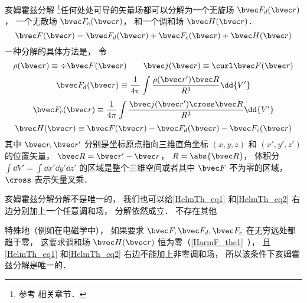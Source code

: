 
\begin{issues}
\issueTODO
\end{issues}


\begin{theorem}{亥姆霍兹分解}
\footnote{参考 \cite{GriffE} 相关章节．}任何处处可导的矢量场都可以分解为一个无旋场 $\bvec F_{d}(\bvec r)$， 一个无散场 $\bvec F_{c}(\bvec r)$， 和一个调和场 $\bvec H(\bvec r)$．
\begin{equation}\label{HelmTh_eq3}
\bvec F(\bvec r) = \bvec F_{d}(\bvec r) + \bvec F_{c}(\bvec r) + \bvec H(\bvec r)
\end{equation}
一种分解的具体方法是， 令
\begin{equation}
\rho(\bvec r) \equiv \div \bvec F(\bvec r) \qquad
\bvec j(\bvec r) \equiv \curl \bvec F(\bvec r)
\end{equation}
\begin{equation}\label{HelmTh_eq1}
\bvec F_{d}(\bvec r) \equiv \frac{1}{4\pi}\int \frac{\rho(\bvec r') \bvec R}{R^3} \dd{V'}
\end{equation}
\begin{equation}\label{HelmTh_eq2}
\bvec F_{c}(\bvec r) \equiv \frac{1}{4\pi}\int \frac{\bvec j(\bvec r')\cross \bvec R}{R^3} \dd{V'}
\end{equation}
\begin{equation}\label{HelmTh_eq4}
\bvec H(\bvec r) \equiv \bvec F(\bvec r) - \bvec F_{d}(\bvec r) - \bvec F_{c}(\bvec r)
\end{equation}
其中 $\bvec r, \bvec r'$ 分别是坐标原点指向三维直角坐标 $(x, y, z)$ 和 $(x', y', z')$ 的位置矢量， $\bvec R = \bvec r' - \bvec r$， $R = \abs{\bvec R}$， 体积分 $\int\dd{V'} = \int\dd{x'}\dd{y'}\dd{z'}$ 的区域是整个三维空间或者其中 $\bvec F$ 不为零的区域， $\cross$ 表示矢量叉乘．

亥姆霍兹分解分解不是唯一的， 我们也可以给\autoref{HelmTh_eq1} 和\autoref{HelmTh_eq2} 右边分别加上一个任意调和场， 分解依然成立． 不存在其他
\end{theorem}

特殊地（例如在电磁学中）， 如果要求 $\bvec F, \bvec F_d, \bvec F_c$ 在无穷远处都趋于零， 这要求调和场 $\bvec H(\bvec r)$ 恒为零（\autoref{HarmF_the1}~）， 且\autoref{HelmTh_eq1} 和\autoref{HelmTh_eq2} 右边不能加上非零调和场， 所以该条件下亥姆霍兹分解是唯一的．


